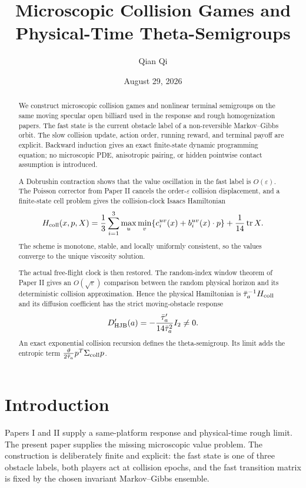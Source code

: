\documentclass[11pt,reqno]{amsart}
\title[Collision games and theta semigroups]{Microscopic Collision Games and Physical-Time Theta-Semigroups}
\author{Qian Qi}
\date{August 29, 2026}
\theoremstyle{definition}
\theoremstyle{remark}
\begin{document}
\begin{abstract}
We construct microscopic collision games and nonlinear terminal semigroups on
the same moving specular open billiard used in the response and rough
homogenization papers.  The fast state is the current obstacle label of a
non-reversible Markov--Gibbs orbit.  The slow collision update, action order,
running reward, and terminal payoff are explicit.  Backward induction gives an
exact finite-state dynamic programming equation; no microscopic PDE,
anisotropic pairing, or hidden pointwise contact assumption is introduced.

A Dobrushin contraction shows that the value oscillation in the fast label is
$O(\varepsilon)$.  The Poisson corrector from Paper II cancels the
order-$\varepsilon$ collision displacement, and a finite-state cell problem
gives the collision-clock Isaacs Hamiltonian
\[
 H_{\rm coll}(x,p,X)
 =
 \frac13\sum_{i=1}^3\max_u\min_v
 \{c_i^{uv}(x)+b_i^{uv}(x)\cdot p\}
 +\frac1{14}\operatorname{tr}X.
\]
The scheme is monotone, stable, and locally uniformly consistent, so the
values converge to the unique viscosity solution.

The actual free-flight clock is then restored.  The random-index window
theorem of Paper II gives an $O(\sqrt\varepsilon)$ comparison between the
random physical horizon and its deterministic collision approximation.
Hence the physical Hamiltonian is $\bar\tau_a^{-1}H_{\rm coll}$ and its
diffusion coefficient has the strict moving-obstacle response
\[
 D_{\rm HJB}'(a)
 =-\frac{\bar\tau_a'}{14\bar\tau_a^2}I_2\ne0.
\]
An exact exponential collision recursion defines the theta-semigroup.  Its
limit adds the entropic term
$\frac{\vartheta}{2\bar\tau_a}p^T\Sigma_{\rm coll}p$.
\end{abstract}

\maketitle
\tableofcontents

\section{Introduction}

Papers I and II supply a same-platform response and physical-time rough limit.
The present paper supplies the missing microscopic value problem.  The
construction is deliberately finite and explicit: the fast state is one of
three obstacle labels, both players act at collision epochs, and the fast
transition matrix is fixed by the chosen invariant Markov--Gibbs ensemble.
\end{document}

